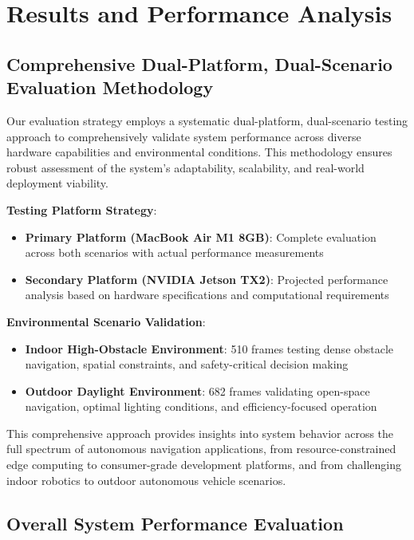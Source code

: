 \documentclass[10pt]{article}
\begin{document}
\section{Results and Performance Analysis}

\subsection{Comprehensive Dual-Platform, Dual-Scenario Evaluation Methodology}

Our evaluation strategy employs a systematic dual-platform, dual-scenario testing approach to comprehensively validate system performance across diverse hardware capabilities and environmental conditions. This methodology ensures robust assessment of the system's adaptability, scalability, and real-world deployment viability.

\textbf{Testing Platform Strategy}:
\begin{itemize}
\item \textbf{Primary Platform (MacBook Air M1 8GB)}: Complete evaluation across both scenarios with actual performance measurements
\item \textbf{Secondary Platform (NVIDIA Jetson TX2)}: Projected performance analysis based on hardware specifications and computational requirements
\end{itemize}

\textbf{Environmental Scenario Validation}:
\begin{itemize}
\item \textbf{Indoor High-Obstacle Environment}: 510 frames testing dense obstacle navigation, spatial constraints, and safety-critical decision making
\item \textbf{Outdoor Daylight Environment}: 682 frames validating open-space navigation, optimal lighting conditions, and efficiency-focused operation
\end{itemize}

This comprehensive approach provides insights into system behavior across the full spectrum of autonomous navigation applications, from resource-constrained edge computing to consumer-grade development platforms, and from challenging indoor robotics to outdoor autonomous vehicle scenarios.

\subsection{Overall System Performance Evaluation}
\end{document}
